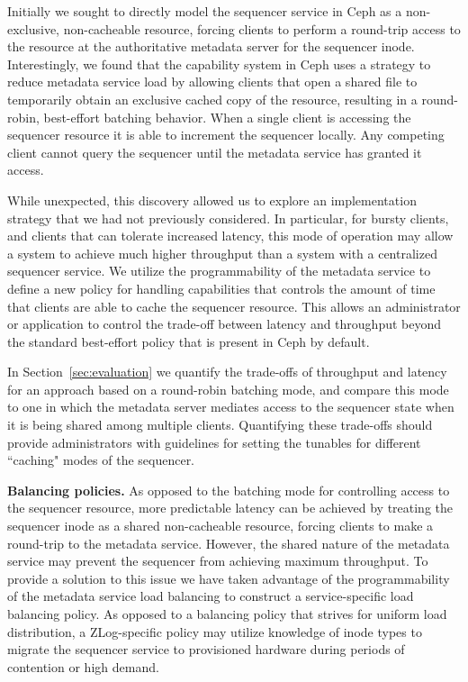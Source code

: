 \documentclass[preprint]{sigplanconf-eurosys}
\begin{document}
Initially we sought to directly model the sequencer service in Ceph as a
non-exclusive, non-cacheable resource, forcing clients to perform a round-trip
access to the resource at the authoritative metadata server for the sequencer
inode.  Interestingly, we found that the capability system in Ceph uses a
strategy to reduce metadata service load by allowing clients that open a
shared file to temporarily obtain an exclusive cached copy of the resource,
resulting in a round-robin, best-effort batching behavior. When a single
client is accessing the sequencer resource it is able to increment the
sequencer locally. Any competing client cannot query the sequencer until the
metadata service has granted it access.

While unexpected, this discovery allowed us to explore an implementation
strategy that we had not previously considered. In particular, for bursty
clients, and clients that can tolerate increased latency, this mode of
operation may allow a system to achieve much higher throughput than a system
with a centralized sequencer service.  We utilize the programmability of the
metadata service to define a new policy for handling capabilities that controls
the amount of time that clients are able to cache the sequencer resource. This
allows an administrator or application to control the trade-off between latency
and throughput beyond the standard best-effort policy that is present in Ceph
by default. 

In Section~\ref{sec:evaluation} we quantify the trade-offs of throughput and
latency for an approach based on a round-robin batching mode, and compare this
mode to one in which the metadata server mediates access to the sequencer state
when it is being shared among multiple clients. Quantifying these trade-offs
should provide administrators with guidelines for setting the tunables for
different ``caching" modes of the sequencer.

{\bf Balancing policies.} As opposed to the batching mode for controlling access to the sequencer
resource, more predictable latency can be achieved by treating the sequencer
inode as a shared non-cacheable resource, forcing clients to make a round-trip
to the metadata service. However, the shared nature of the metadata service
may prevent the sequencer from achieving maximum throughput. To provide a
solution to this issue we have taken advantage of the programmability of the
metadata service load balancing to construct a service-specific load balancing
policy. As opposed to a balancing policy that strives for uniform
load distribution, a ZLog-specific policy may utilize knowledge of inode types
to migrate the sequencer service to provisioned hardware during periods of
contention or high demand.
\end{document}
